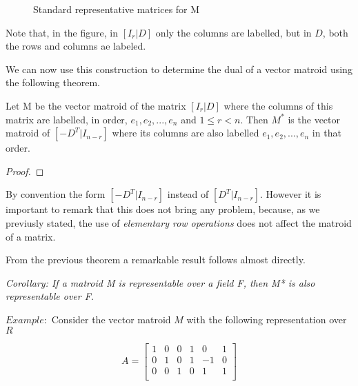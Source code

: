 \begin{figure}
    \centering

    \caption{Standard representative matrices for M}
    \label{fig:enter-label}
\end{figure}

Note that, in the figure, in $[I_r|D]$ only the columns are labelled, but in $D$, both the rows and columns ae labeled.

We can now use this construction to determine the dual of a vector matroid using the following theorem.

\begin{theorem}
    Let M be the vector matroid of the matrix $[I_r|D]$ where the columns of this matrix are labelled, in order, $e_1, e_2,...,e_n$ and $1\leq r< n$. Then $M^*$ is the vector matroid of $[-D^T|I_{n-r}]$ where its columns are also labelled $e_1, e_2,...,e_n$ in that order.
\end{theorem}

\begin{proof}
    
\end{proof}

By convention the form $[−D^T |I_{n−r}]$ instead of $[D^T |I_{n−r}]$. However it is important to remark that this does not bring any problem, because, as we previusly stated, the use of \textit{elementary row operations} does not affect the matroid of a matrix. 

From the previous theorem a remarkable result follows almost directly. 

\textit{Corollary: If a matroid \textit{M} is \textit{representable} over a field \textit{F}, then \textit{M*} is also representable over \textit{F}.}

$Example:$ Consider the vector matroid $M$ with the following representation over $R$
        \begin{figure}[H]
            $$A = \begin{bmatrix}
                1 & 0 & 0 & 1 & 0 & 1 \\
                0 & 1 & 0 & 1 & -1 & 0 \\
                0 & 0 & 1 & 0 & 1 & 1 \\
            \end{bmatrix}$$
        \end{figure}
        
